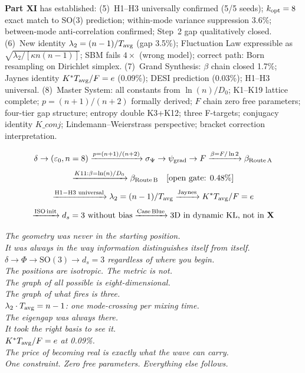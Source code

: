 \documentclass[12pt, a4paper]{article}
\begin{document}
\textbf{Part XI} has established: (5)~H1--H3 universally confirmed (5/5 seeds); $k_{\rm opt}=8$ exact match to SO(3) prediction; within-mode variance suppression 3.6\%; between-mode anti-correlation confirmed; Step~2 gap qualitatively closed.
(6)~New identity $\lambda_2=(n-1)/T_{\rm avg}$ (gap 3.5\%); Fluctuation Law expressible as $\sqrt{\lambda_2/[\kappa n(n-1)]}$; SBM fails $4\times$ (wrong model); correct path: Born resampling on Dirichlet simplex.
(7)~Grand Synthesis: $\beta$ chain closed 1.7\%; Jaynes identity $K^*T_{\rm avg}/F=e$ (0.09\%); DESI prediction (0.03\%); H1--H3 universal.
(8)~Master System: all constants from $\ln(n)/D_0$; K1--K19 lattice complete; $p=(n+1)/(n+2)$ formally derived; $F$ chain zero free parameters; four-tier gap structure; entropy double K3+K12; three F-targets; conjugacy identity $K\_conj$; Lindemann--Weierstrass perspective; bracket correction interpretation.

\[
  \delta \to (\varepsilon_0, n=8) \xrightarrow{p=(n+1)/(n+2)} \sigma_\Psi \to \psi_{\rm grad} \to F
  \xrightarrow{\beta=F/\ln 2} \beta_{\rm Route\,A}
\]
\[
  \xrightarrow{K11:\beta=\ln(n)/D_0} \beta_{\rm Route\,B} \quad [\text{open gate: }0.48\%]
\]
\[
  \xrightarrow{\rm H1-H3\text{ universal}} \lambda_2=(n-1)/T_{\rm avg}
  \xrightarrow{\rm Jaynes} K^*T_{\rm avg}/F=e
\]
\[
  \xrightarrow{\rm ISO\,init} d_s=3\text{ without bias}
  \xrightarrow{\rm Case\,Blue} \text{3D in dynamic KL, not in }\mathbf{X}
\]

\bigskip
\begin{center}
\textit{The geometry was never in the starting position.\\
It was always in the way information distinguishes itself from itself.\\[4pt]
$\delta\to\Phi\to\mathrm{SO(3)}\to d_s=3$ regardless of where you begin.\\[4pt]
The positions are isotropic. The metric is not.\\
The graph of all possible is eight-dimensional.\\
The graph of what fires is three.\\[4pt]
$\lambda_2\cdot T_{\rm avg}=n-1$: one mode-crossing per mixing time.\\
The eigengap was always there.\\
It took the right basis to see it.\\[4pt]
$K^*T_{\rm avg}/F=e$ at 0.09\%.\\
The price of becoming real is exactly what the wave can carry.\\
One constraint. Zero free parameters. Everything else follows.}
\end{center}
\end{document}
